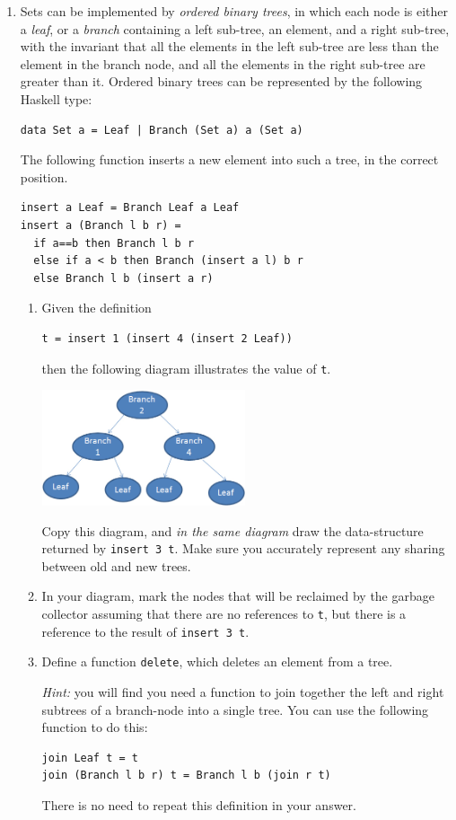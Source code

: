 \documentclass{article}
\begin{document}
\begin{enumerate}
\item
Sets can be implemented by {\em ordered binary trees}, in which each
node is either a {\em leaf}, or a {\em branch} containing a left
sub-tree, an element, and a right sub-tree, with the invariant that
all the elements in the left sub-tree are less than the element in the
branch node, and all the elements in the right sub-tree are greater
than it. Ordered binary trees can be represented by the following
Haskell type:
\begin{verbatim}
data Set a = Leaf | Branch (Set a) a (Set a)
\end{verbatim}
The following function inserts a new element into such a
tree, in the correct position.
\begin{verbatim}
insert a Leaf = Branch Leaf a Leaf
insert a (Branch l b r) =
  if a==b then Branch l b r
  else if a < b then Branch (insert a l) b r
  else Branch l b (insert a r)
\end{verbatim}
\begin{enumerate}
\item
Given the definition
\begin{verbatim}
t = insert 1 (insert 4 (insert 2 Leaf))
\end{verbatim}
then the following diagram illustrates the value of
\verb!t!.

\includegraphics[width=6cm]{tree.jpg} 

Copy this diagram, and {\em in the same diagram} draw the data-structure
returned by \verb!insert 3 t!. Make sure you accurately represent any
sharing between old and new trees.


\item
In your diagram, mark the nodes that will be reclaimed by the garbage
collector assuming that there are no references to \verb!t!, but there
is a reference to the result of \verb!insert 3 t!.


\item
Define a function \verb!delete!, which deletes an element from a tree.


{\em Hint:} you will find you need a function to join together the
left and right subtrees of a branch-node into a single tree. You can
use the following function to do this:
\begin{verbatim}
join Leaf t = t
join (Branch l b r) t = Branch l b (join r t)
\end{verbatim}
There is no need to repeat this definition in your answer.


\end{enumerate}
\end{enumerate}
\end{document}

